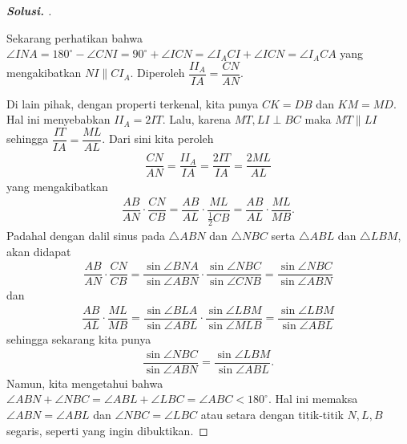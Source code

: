 \documentclass[letterpaper, 13pt]{scrartcl}
\begin{document}
\begin{proof}[\textbf{Solusi. }]
\begin{center}
\end{center}

Sekarang perhatikan bahwa $\angle INA = 180^\circ - \angle CNI = 90^\circ + \angle ICN = \angle I_ACI + \angle ICN = \angle I_ACA$ yang mengakibatkan $NI \parallel CI_A$. Diperoleh $\dfrac{II_A}{IA}=\dfrac{CN}{AN}$.

Di lain pihak, dengan properti terkenal, kita punya $CK=DB$ dan $KM=MD$. Hal ini menyebabkan $II_A = 2 IT$. Lalu, karena $MT, LI \perp BC$ maka $MT \parallel LI$ sehingga $\dfrac{IT}{IA}=\dfrac{ML}{AL}$. Dari sini kita peroleh
\begin{align*}
    \dfrac{CN}{AN} = \dfrac{II_A}{IA} = \dfrac{2IT}{IA} = \dfrac{2ML}{AL}
\end{align*}
yang mengakibatkan
\begin{align*}
    \dfrac{AB}{AN} \cdot \dfrac{CN}{CB} = \dfrac{AB}{AL} \cdot \dfrac{ML}{\frac{1}{2}CB} = \dfrac{AB}{AL} \cdot \dfrac{ML}{MB}.
\end{align*}
Padahal dengan dalil sinus pada $\triangle ABN$ dan $\triangle NBC$ serta $\triangle ABL$ dan $\triangle LBM$, akan didapat
\begin{align*}
    \dfrac{AB}{AN}\cdot\dfrac{CN}{CB} = \dfrac{\sin \angle BNA}{\sin \angle ABN} \cdot \dfrac{\sin \angle NBC}{\sin \angle CNB} = \dfrac{\sin \angle NBC}{\sin \angle ABN}
\end{align*}
dan
\begin{align*}
    \dfrac{AB}{AL}\cdot\dfrac{ML}{MB} = \dfrac{\sin \angle BLA}{\sin \angle ABL} \cdot \dfrac{\sin \angle LBM}{\sin \angle MLB} = \dfrac{\sin \angle LBM}{\sin \angle ABL}
\end{align*}
sehingga sekarang kita punya
\begin{align*}
    \dfrac{\sin \angle NBC}{\sin \angle ABN} = \dfrac{\sin \angle LBM}{\sin \angle ABL}.
\end{align*}
Namun, kita mengetahui bahwa $\angle ABN + \angle NBC = \angle ABL + \angle LBC = \angle ABC < 180^\circ$. Hal ini memaksa $\angle ABN = \angle ABL$ dan $\angle NBC = \angle LBC$ atau setara dengan titik-titik $N,L,B$ segaris, seperti yang ingin dibuktikan.
\end{proof}
\end{document}
